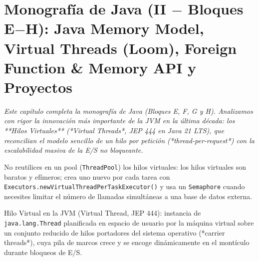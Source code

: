 \documentclass{book}
\begin{document}
\chapter{Monografía de Java (II \(-\) Bloques E\(-\)H): Java Memory Model, Virtual Threads (Loom), Foreign Function \& Memory API y Proyectos}
\label{chap:cap04-java-avanzado-experto-virtual-threads-jmm-spring-proyectos}

\noindent\textit{Este capítulo completa la monografía de Java (Bloques E, F, G y H). Analizamos con rigor la innovación más importante de la JVM en la última década: los **Hilos Virtuales** (*Virtual Threads*, JEP 444 en Java 21 LTS), que reconcilian el modelo sencillo de un hilo por petición (*thread-per-request*) con la escalabilidad masiva de la E/S no bloqueante.}

\begin{tcolorbox}[title={Consejo}, studiumtip, breakable]

No reutilices en un pool (\texttt{ThreadPool}) los hilos virtuales: los hilos virtuales son baratos y efímeros; crea uno nuevo por cada tarea con \texttt{Executors.newVirtualThreadPerTaskExecutor()} y usa un \texttt{Semaphore} cuando necesites limitar el número de llamadas simultáneas a una base de datos externa.
\end{tcolorbox}

\begin{tcolorbox}[title={Definición}, studiumdef, breakable]

Hilo Virtual en la JVM (Virtual Thread, JEP 444): instancia de \texttt{java.lang.Thread} planificada en espacio de usuario por la máquina virtual sobre un conjunto reducido de hilos portadores del sistema operativo (*carrier threads*), cuya pila de marcos crece y se encoge dinámicamente en el montículo durante bloqueos de E/S.
\end{tcolorbox}
\end{document}
